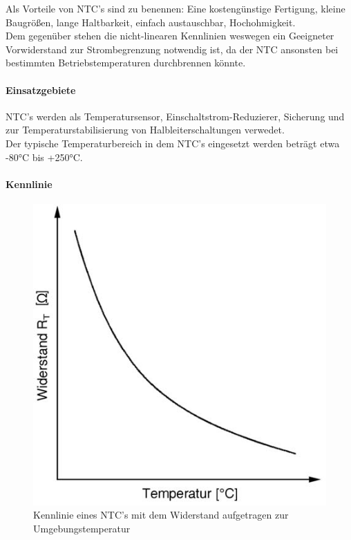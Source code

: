Als Vorteile von NTC's sind zu benennen: Eine kostengünstige Fertigung, kleine Baugrößen, lange Haltbarkeit, einfach austauschbar, Hochohmigkeit.\\
Dem gegenüber stehen die nicht-linearen Kennlinien weswegen ein Geeigneter Vorwiderstand zur Strombegrenzung notwendig ist, da der NTC ansonsten bei bestimmten Betriebstemperaturen durchbrennen könnte.

\paragraph{Einsatzgebiete}

NTC's werden als Temperatursensor, Einschaltstrom-Reduzierer, Sicherung und zur Temperaturstabilisierung von Halbleiterschaltungen verwedet.\\
Der typische Temperaturbereich in dem NTC's eingesetzt werden beträgt etwa -80°C bis +250°C.

\paragraph{Kennlinie}

\begin{figure}[h!]
	\centering
	\includegraphics[scale=0.7]{pics/ntc-kennlinie.jpg}
	\caption{Kennlinie eines NTC's mit dem Widerstand aufgetragen zur Umgebungstemperatur}
	\label{fig:ntc}
\end{figure}

